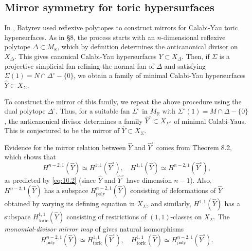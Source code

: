 \documentclass{amsart}
\theoremstyle{plain}
\theoremstyle{definition}
\begin{document}
	\subsection{Mirror symmetry for toric hypersurfaces} In
\cite{Bat1}, Batyrev used reflexive polytopes to construct mirrors for
Calabi-Yau toric hypersurfaces.  As in \S8, the process starts with an
$n$-dimensional reflexive polytope $\Delta \subset M_\mathbb{R}$, which
by definition determines the anticanonical divisor on $X_\Delta$.
This gives canonical Calabi-Yau hypersurfaces $Y \subset X_\Delta$.
Then, if $\Sigma$ is a projective simplicial fan refining the normal
fan of $\Delta$ and satisfying $\Sigma(1) = N\cap\Delta^\circ -
\{0\}$, we obtain a family of minimal Calabi-Yau hypersurfaces
$\widehat Y \subset X_\Sigma$.

	To construct the mirror of this family, we repeat the above
procedure using the dual polytope $\Delta^\circ$.  Thus, for a
suitable fan $\Sigma^\circ$ in $M_\mathbb{R}$ with $\Sigma^\circ(1) =
M\cap\Delta - \{0\}$, the anticanonical divisor determines a family
$\widehat Y^\circ \subset X_{\Sigma^\circ}$ of minimal Calabi-Yaus.
This is conjectured to be the mirror of $\widehat Y \subset X_\Sigma$.

	Evidence for the mirror relation between $\widehat Y$ and
$\widehat Y^\circ$ comes from Theorem 8.2, which shows that
\[
H^{n-2,1}(\widehat Y) \simeq H^{1,1}(\widehat Y^\circ),\quad
H^{1,1}(\widehat Y) \simeq H^{n-2,1}(\widehat Y^\circ),
\]
as predicted by \eqref{eq:10.2} (since $\widehat Y$ and $\widehat
Y^\circ$ have dimension $n-1$).  Also, $H^{n-2,1}(\widehat Y)$ has a
subspace $H^{n-2,1}_{\mathrm{poly}}(\widehat Y)$ consisting of
deformations of $\widehat Y$ obtained by varying its defining equation
in $X_{\Sigma}$, and similarly, $H^{1,1}(\widehat Y)$ has a subspace
$H^{1,1}_{\mathrm{toric}}(\widehat Y)$ consisting of restrictions of
$(1,1)$-classes on $X_{\Sigma}$.  The {\it monomial-divisor mirror
map\/} of \cite{AGM2} gives natural isomorphisms
\[
H^{n-2,1}_{\mathrm{poly}}(\widehat Y) \simeq
H^{1,1}_{\mathrm{toric}}(\widehat Y^\circ),\quad
H^{1,1}_{\mathrm{toric}}(\widehat Y) \simeq
H^{n-2,1}_{\mathrm{poly}}(\widehat Y^\circ).
\]
\end{document}
